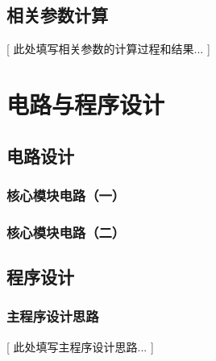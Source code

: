 \documentclass{ctexart}
\begin{document}
\subsection{相关参数计算}
    [ 此处填写相关参数的计算过程和结果... ]
    
\section{电路与程序设计}
\subsection{电路设计}
\subsubsection{核心模块电路（一）}
    
\subsubsection{核心模块电路（二）}

\subsection{程序设计}
\subsubsection{主程序设计思路}
    [ 此处填写主程序设计思路... ]
\end{document}
